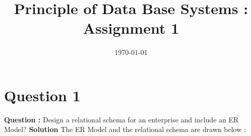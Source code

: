 \documentclass[a4paper]{article}
\title{Principle of Data Base Systems : Assignment 1}
\date{\today}
\begin{document}
\maketitle

\section{Question 1}
\label{sec:q1}
{\bf Question :} Design a relational schema for an enterprise and include an ER Model?
{\bf Solution} The ER Model and the relational schema are drawn below :
\end{document}
